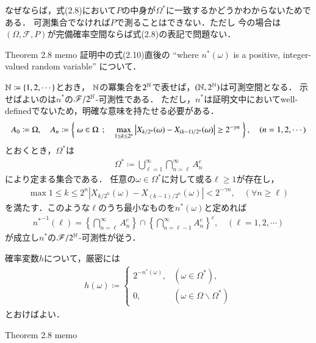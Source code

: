 	なぜならば，式(2.8)において$P$の中身が$\Omega^*$に一致するかどうかわからないためである．
	可測集合でなければ$P$で測ることはできない．ただし
	今の場合は$(\Omega,\mathscr{F},P)$が完備確率空間ならば式(2.8)の表記で問題ない．
	
	
	\begin{itembox}[l]{Theorem 2.8 memo}
		証明中の式(2.10)直後の
		``where $n^*(\omega)$ is a positive, integer-valued random variable''
		について．
	\end{itembox}
	
	\begin{prf}
		$\mathbb{N} \coloneqq \{1,2,\cdots\}$とおき，
		$\mathbb{N}$の冪集合を$2^{\mathbb{N}}$で表せば，$(\mathbb{N},2^{\mathbb{N}})$は可測空間となる．
		示せばよいのは$n^*$の$\mathscr{F}/2^{\mathbb{N}}$-可測性である．
		ただし，$n^*$は証明文中においてwell-definedでないため，明確な意味を持たせる必要がある．
		\begin{align}
			A_0 \coloneqq \Omega,
			\quad A_n \coloneqq \left\{\ \omega \in \Omega\ \, ; \quad \operatorname*{max}_{1 \leq k \leq 2^n} \left| X_{k/2^n}(\omega) - X_{(k-1)/2^n}(\omega) \right| \geq 2^{-\gamma n}\ \right\},
			\quad (n=1,2,\cdots)
		\end{align}
		とおくとき，$\Omega^*$は
		\begin{align}
			\Omega^* \coloneqq \bigcup_{\ell =1}^{\infty} \bigcap_{n = \ell}^\infty A_n^c
		\end{align}
		により定まる集合である．
		任意の$\omega \in \Omega^*$に対して或る$\ell \geq 1$が存在し，
		\begin{align}
			\max{1 \leq k \leq 2^n}{\left| X_{k/2^n}(\omega) - X_{(k-1)/2^n}(\omega) \right|} < 2^{-\gamma n},
			\quad (\forall n \geq \ell)
		\end{align}
		を満たす．このような$\ell$のうち最小なものを$n^*(\omega)$と定めれば
		\begin{align}
			{n^*}^{-1}(\ell) = \left\{ \bigcap_{n = \ell}^\infty A_n^c \right\} \cap \left\{ \bigcap_{n = \ell-1}^\infty A_n^c \right\}^c,
			\quad (\ell =1,2,\cdots)
		\end{align}
		が成立し$n^*$の$\mathscr{F}/2^{\mathbb{N}}$-可測性が従う．
		\QED
	\end{prf}
	
	確率変数$h$について，厳密には
	\begin{align}
		h(\omega) \coloneqq 
		\begin{cases}
			2^{-n^*(\omega)}, & (\omega \in \Omega^*), \\
			0, & (\omega \in \Omega \backslash \Omega^*)
		\end{cases}
	\end{align}
	とおけばよい．
	
	\begin{itembox}[l]{Theorem 2.8 memo}
	\end{itembox}